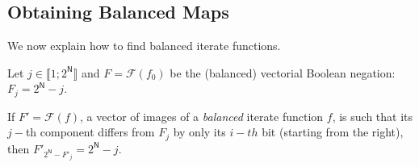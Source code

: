 %
%

\subsection{Obtaining Balanced Maps}
\label{The generation of pseudo-random sequence}


We now explain how to find balanced iterate functions.

\begin{theorem}
Let $j \in \llbracket 1; 2^\mathsf{N} \rrbracket$ and $F = \mathcal{F}(f_0)$ be the (balanced) vectorial Boolean negation: $F_{j}=2^\mathsf{N}-j$.

If $F' = \mathcal{F}(f)$, a vector of images of a \emph{balanced} iterate function $f$, is such that its $j-$th component differs from $F_j$ by only its $i-th$ bit (starting from the right), then $F'_{2^\mathsf{N}-F'_j}=2^\mathsf{N}-j$.
\end{theorem}

